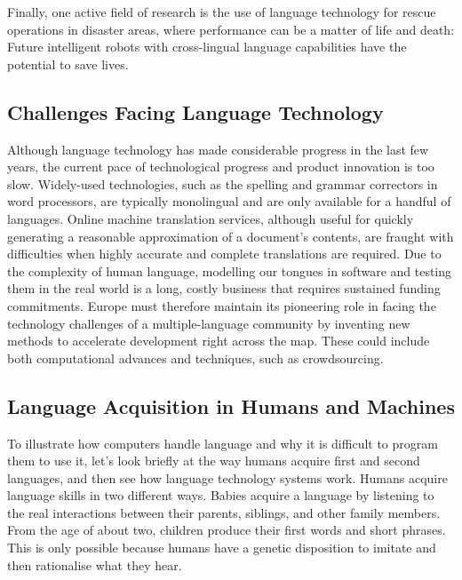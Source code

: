 \begin{multicols}{2}
Finally, one active field of research is the use of language technology for rescue operations in disaster areas, where performance can be a matter of life and death: Future intelligent robots with cross-lingual language capabilities have the potential to save lives.

\subsection{Challenges Facing Language Technology}
Although language technology has made considerable progress in the last few years, the current pace of technological progress and product innovation is too slow.
Widely-used technologies, such as the spelling and grammar correctors in word processors, are typically monolingual and are only available for a handful of languages.
Online machine translation services, although useful for quickly generating a reasonable approximation of a document's contents, are fraught with difficulties when highly accurate and complete translations are required.
Due to the complexity of human language, modelling our tongues in software and testing them in the real world is a long, costly business that requires sustained funding commitments.
Europe must therefore maintain its pioneering role in facing the technology challenges of a multiple-language community by inventing new methods to accelerate development right across the map.
These could include both computational advances and techniques, such as crowdsourcing.

\subsection{Language Acquisition in Humans and Machines}

To illustrate how computers handle language and why it is difficult to program them to use it, let's look briefly at the way humans acquire first and second languages, and then see how language technology systems work. 
Humans acquire language skills in two different ways.
Babies acquire a language by listening to the real interactions between their parents, siblings, and other family members.
From the age of about two, children produce their first words and short phrases.
This is only possible because humans have a genetic disposition to imitate and then rationalise what they hear. 


\end{multicols}
